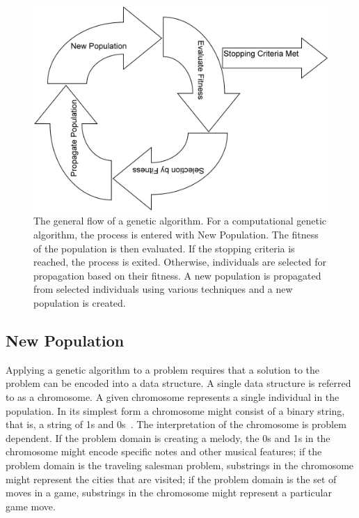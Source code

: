 \begin{figure}[htp]
\centerline{\includegraphics[width=1.0\columnwidth]{Figures/GAFlow.png}}
\caption[Genetic Algorithm Flow]{The general flow of a genetic algorithm. For a
computational genetic algorithm, the process is entered with New Population.
The fitness of the population is then evaluated. If the stopping criteria is
reached, the process is exited. Otherwise, individuals are selected for
propagation based on their fitness. A new population is propagated from
selected individuals using various techniques and a new population is created.}
\label{figure-gaflow}
\end{figure}

\subsection{New Population}

Applying a genetic algorithm to a problem requires that a solution to the
problem can be encoded into a data structure. A single data structure is
referred to as a chromosome. A given chromosome represents a single individual
in the population. In its simplest form a chromosome might consist of a binary
string, that is, a string of 1s and 0s~\cite{Holland1992,goldberg1989genetic}.
The interpretation of the chromosome is problem dependent. If the problem domain
is creating a melody, the 0s and 1s in the chromosome might encode specific
notes and other musical features; if the problem domain is the traveling
salesman problem, substrings in the chromosome might represent the cities that
are visited; if the problem domain is the set of moves in a game, substrings in
the chromosome might represent a particular game move.

